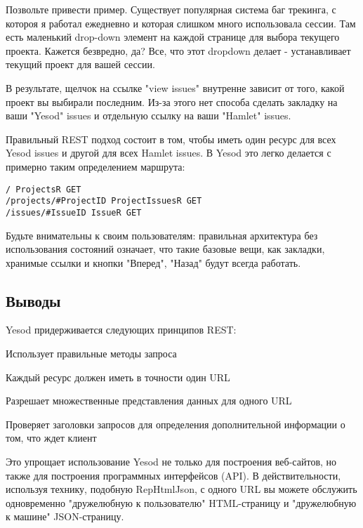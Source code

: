 Позвольте привести пример. Существует популярная система баг трекинга, с котороя я работал ежедневно и которая слишком много использовала сессии. Там есть маленький drop-down элемент на каждой странице для выбора текущего проекта. Кажется безвредно, да? Все, что этот dropdown делает - устанавливает текущий проект для вашей сессии.

В результате, щелчок на ссылке "view issues" внутренне зависит от того, какой проект вы выбирали последним. Из-за этого нет способа сделать закладку на ваши "Yesod" issues и отдельную ссылку на ваши "Hamlet" issues.

Правильный REST подход состоит в том, чтобы иметь один ресурс для всех Yesod issues и другой для всех Hamlet issues. В Yesod это легко делается с примерно таким определением маршрута:

\begin{lstlisting}
/ ProjectsR GET
/projects/#ProjectID ProjectIssuesR GET
/issues/#IssueID IssueR GET
\end{lstlisting}

Будьте внимательны к своим пользователям: правильная архитектура без использования состояний означает, что такие базовые вещи, как закладки, хранимые ссылки и кнопки "Вперед", "Назад" будут всегда работать.

\subsection{Выводы}

Yesod придерживается следующих принципов REST:
\item{Использует правильные методы запроса}
\item{Каждый ресурс должен иметь в точности один URL}
\item{Разрешает множественные представления данных для одного URL}
\item{Проверяет заголовки запросов для определения дополнительной информации о том, что ждет клиент}

Это упрощает использование Yesod не только для построения веб-сайтов, но также для построения программных интерфейсов (API). В действительности, используя технику, подобную RepHtmlJson, с одного URL вы можете обслужить одновременно "дружелюбную к пользователю" HTML-страницу и "дружелюбную к машине" JSON-страницу.







 




